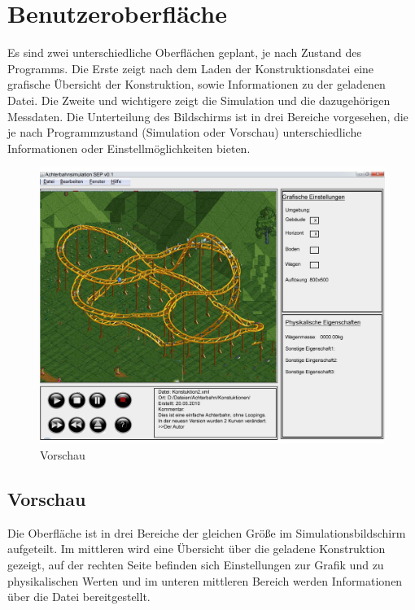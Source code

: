 
\chapter{Benutzeroberfläche}
Es sind zwei unterschiedliche Oberflächen geplant, je nach Zustand des Programms. Die Erste zeigt nach dem Laden der Konstruktionsdatei eine grafische Übersicht der Konstruktion, sowie Informationen zu der geladenen Datei. Die Zweite und wichtigere zeigt die Simulation und die dazugehörigen Messdaten. Die Unterteilung des Bildschirms ist in drei Bereiche vorgesehen, die je nach Programmzustand (Simulation oder Vorschau) unterschiedliche Informationen oder Einstellmöglichkeiten bieten.




\begin{figure}[!h]%
\includegraphics[width=0.8\linewidth]{./bilder/GUI_v3.jpg}%
\caption{Vorschau}%
\label{Vorschau}%
\end{figure}

\section*{Vorschau}
Die Oberfläche ist in drei Bereiche der gleichen Größe im Simulationsbildschirm aufgeteilt. Im mittleren wird eine Übersicht über die geladene Konstruktion gezeigt, auf der rechten Seite befinden sich Einstellungen zur Grafik und zu physikalischen Werten und im unteren mittleren Bereich werden Informationen über die Datei bereitgestellt.


